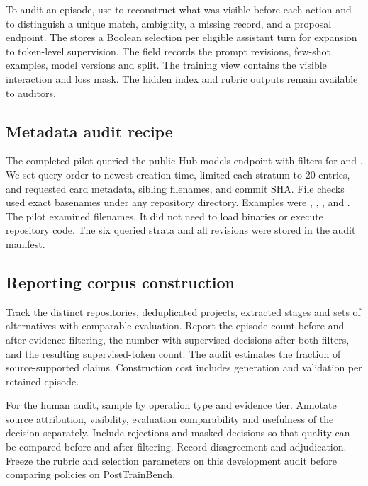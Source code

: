 To audit an episode, use  to reconstruct what was visible before each action and  to distinguish a unique match, ambiguity, a missing record, and a proposal endpoint. The  stores a Boolean selection per eligible assistant turn for expansion to token-level supervision. The  field records the prompt revisions, few-shot examples, model versions and split. The training view contains the visible interaction and loss mask. The hidden index and rubric outputs remain available to auditors.

\subsection{Metadata audit recipe}

The completed pilot queried the public Hub models endpoint with filters for  and . We set query order to newest creation time, limited each stratum to 20 entries, and requested card metadata, sibling filenames, and commit SHA. File checks used exact basenames under any repository directory. Examples were , , , and . The pilot examined filenames. It did not need to load binaries or execute repository code. The six queried strata and all revisions were stored in the audit manifest.

\subsection{Reporting corpus construction}

Track the distinct repositories, deduplicated projects, extracted stages and sets of alternatives with comparable evaluation. Report the episode count before and after evidence filtering, the number with supervised decisions after both filters, and the resulting supervised-token count. The audit estimates the fraction of source-supported claims. Construction cost includes generation and validation per retained episode.

For the human audit, sample by operation type and evidence tier. Annotate source attribution, visibility, evaluation comparability and usefulness of the decision separately. Include rejections and masked decisions so that quality can be compared before and after filtering. Record disagreement and adjudication. Freeze the rubric and selection parameters on this development audit before comparing policies on PostTrainBench.


